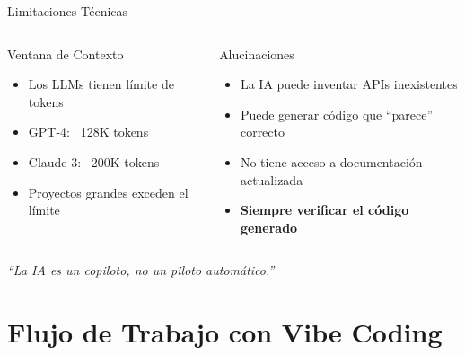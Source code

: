 \documentclass[aspectratio=169]{beamer}
\begin{document}
\begin{frame}{Limitaciones Técnicas}
    \begin{columns}[t]
        \begin{alertblock}{Ventana de Contexto}
            \begin{itemize}
                \item Los LLMs tienen límite de tokens
                \item GPT-4: ~128K tokens
                \item Claude 3: ~200K tokens
                \item Proyectos grandes exceden el límite
            \end{itemize}
        \end{alertblock}
        
        \begin{alertblock}{Alucinaciones}
            \begin{itemize}
                \item La IA puede inventar APIs inexistentes
                \item Puede generar código que ``parece'' correcto
                \item No tiene acceso a documentación actualizada
                \item \textbf{Siempre verificar el código generado}
            \end{itemize}
        \end{alertblock}
    \end{columns}
    
    \vspace{0.5cm}
    \centering
    \textit{``La IA es un copiloto, no un piloto automático.''}
\end{frame}

\section{Flujo de Trabajo con Vibe Coding}
\end{document}
